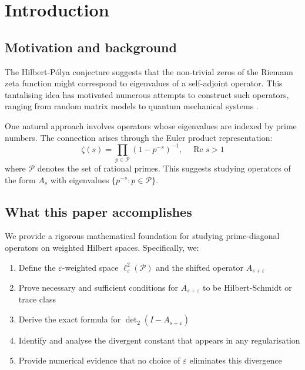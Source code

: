 \documentclass[11pt,a4paper]{article}
\theoremstyle{definition}
\theoremstyle{remark}
\newcommand{\calP}{\mathcal{P}}
\DeclareMathOperator{\det}{det}
\DeclareMathOperator{\Re}{Re}
\begin{document}
\section{Introduction}\label{sec:intro}

\subsection{Motivation and background}

The Hilbert-Pólya conjecture suggests that the non-trivial zeros of the Riemann 
zeta function might correspond to eigenvalues of a self-adjoint operator. This 
tantalising idea has motivated numerous attempts to construct such operators, 
ranging from random matrix models \cite{BerryKeating1999} to quantum mechanical 
systems \cite{ConnesTrace1997}.

One natural approach involves operators whose eigenvalues are indexed by prime 
numbers. The connection arises through the Euler product representation:
\[
\zeta(s) = \prod_{p \in \calP} (1 - p^{-s})^{-1}, \quad \Re s > 1
\]
where $\calP$ denotes the set of rational primes. This suggests studying operators 
of the form $A_s$ with eigenvalues $\{p^{-s} : p \in \calP\}$.

\subsection{What this paper accomplishes}

We provide a rigorous mathematical foundation for studying prime-diagonal operators 
on weighted Hilbert spaces. Specifically, we:

\begin{enumerate}
\item Define the $\varepsilon$-weighted space $\ell^2_\varepsilon(\calP)$ and the 
      shifted operator $A_{s+\varepsilon}$
\item Prove necessary and sufficient conditions for $A_{s+\varepsilon}$ to be 
      Hilbert-Schmidt or trace class
\item Derive the exact formula for $\det_2(I - A_{s+\varepsilon})$
\item Identify and analyse the divergent constant that appears in any regularisation
\item Provide numerical evidence that no choice of $\varepsilon$ eliminates this divergence
\end{enumerate}
\end{document}
